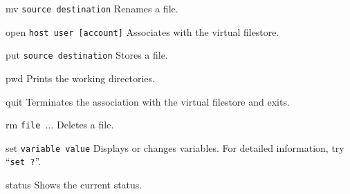 \begin{describe}
\item[mv {\tt source destination}]
Renames a file.

\item[open {\tt host user [account]}]
Associates with the virtual filestore.

\item[put {\tt source destination}]
Stores a file.

\item[pwd]
Prints the working directories.

\item[quit]
Terminates the association with the virtual filestore and exits.

\item[rm {\tt file $\ldots$}]
Deletes a file.

\item[set {\tt variable value}]
Displays or changes variables.
For detailed information, try ``\verb*"set ?"''.

\item[status]
Shows the current status.
\end{describe}

